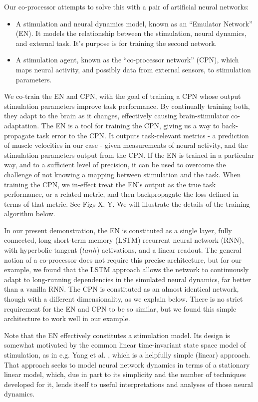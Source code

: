 \documentclass[12pt]{iopart}
\begin{document}
Our co-processor attempts to solve this with a pair of artificial neural networks:
\begin{itemize}
	\item A stimulation and neural dynamics model, known as an ``Emulator Network'' (EN). It models the relationship
	      between the stimulation, neural dynamics, and external task. It's purpose is for training the second network.
	\item A stimulation agent, known as the ``co-processor network'' (CPN), which maps neural activity, and possibly
	      data from external sensors, to stimulation parameters.
\end{itemize}

We co-train the EN and CPN, with the goal of training a CPN whose output stimulation parameters
improve task performance. By continually training both, they adapt to the brain as it changes,
effectively causing brain-stimulator co-adaptation. The EN is a tool for training the CPN,
giving us a way to back-propagate task error to the CPN. It outputs task-relevant
metrics - a prediction of muscle velocities in our case - given measurements of neural
activity, and the stimulation parameters output from the CPN. If the EN is trained in a
particular way, and to a sufficient level of precision, it can be used to overcome the
challenge of not knowing a mapping between stimulation and the task. When training the
CPN, we in-effect treat the EN's output as the true task performance, or a related
metric, and then backpropagate the loss defined in terms of that metric. See Figs X, Y.
We will illustrate the details of the training algorithm below.

In our present demonstration, the EN is constituted as a single layer, fully connected,
long short-term memory (LSTM) recurrent neural network (RNN), with hyperbolic tangent ($tanh$)
activations, and a linear readout. The general notion of a co-processor does
not require this precise architecture, but for our example, we found that the LSTM
approach allows the network to continuously adapt to long-running dependencies in
the simulated neural dynamics, far better than a vanilla RNN. The CPN is constituted
as an almost identical network, though with a different dimensionality, as we explain
below. There is no strict requirement for the EN and CPN to be so similar, but we
found this simple architecture to work well in our example.

Note that the EN effectively constitutes a stimulation model. Its design is
somewhat motivated by the common linear time-invariant state space model of
stimulation, as in e.g. Yang et al. \cite{shanechi.stimmodel}, which is a helpfully
simple (linear) approach. That approach seeks to model neural network dynamics in
terms of a stationary linear model, which, due in part to its simplicity and the
number of techniques developed for it, lends itself to useful interpretations and
analyses of those neural dynamics.
\end{document}
